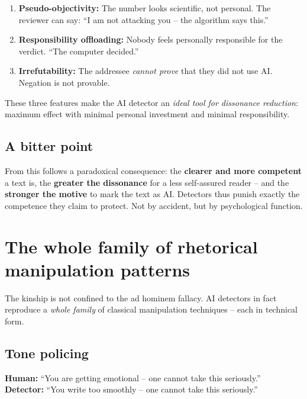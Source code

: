 \begin{enumerate}[leftmargin=2em,itemsep=2pt,topsep=2pt]
  \item \textbf{Pseudo-objectivity:} The number looks scientific,
        not personal. The reviewer can say: \enquote{I am not
        attacking you -- the algorithm says this.}
  \item \textbf{Responsibility offloading:} Nobody feels personally
        responsible for the verdict. \enquote{The computer decided.}
  \item \textbf{Irrefutability:} The addressee \emph{cannot prove}
        that they did not use AI. Negation is not provable.
\end{enumerate}

These three features make the AI detector an \emph{ideal tool for
dissonance reduction}: maximum effect with minimal personal
investment and minimal responsibility.

\subsection{A bitter point}

From this follows a paradoxical consequence: the \textbf{clearer
and more competent} a text is, the \textbf{greater the dissonance}
for a less self-assured reader -- and the \textbf{stronger the
motive} to mark the text as AI. Detectors thus punish exactly the
competence they claim to protect. Not by accident, but by
psychological function.

\section{The whole family of rhetorical manipulation patterns}

The kinship is not confined to the ad hominem fallacy. AI detectors
in fact reproduce a \emph{whole family} of classical manipulation
techniques -- each in technical form.

\subsection{Tone policing}
\textbf{Human:} \enquote{You are getting emotional -- one cannot
take this seriously.}\\
\textbf{Detector:} \enquote{You write too smoothly -- one cannot
take this seriously.}

